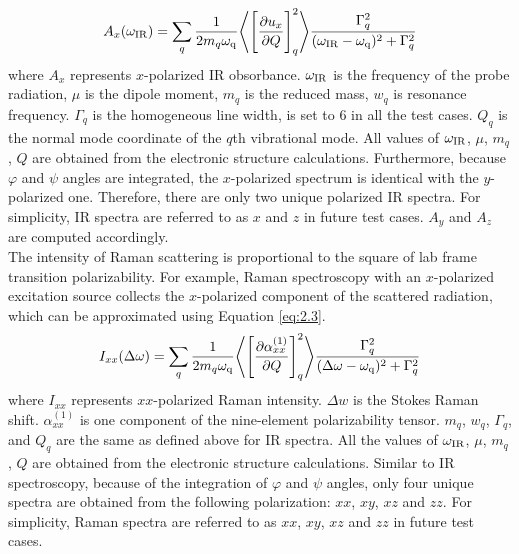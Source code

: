 \begin{equation} \label{eq:2.2}
A_x(\omega_{\rm IR}) = \sum_{q} \frac{1}{2 m_{q} \omega_{\rm q}} \Bigg \langle \Bigg\lbrack \frac{\partial u_x}{\partial Q} \Bigg\rbrack_{q} ^2 \Bigg\rangle \frac{\Gamma_q^2}{(\omega_{\rm IR}-\omega_{\rm q})^2 + \Gamma_q^2}
\end{equation} 
where $A_x$ represents $x$-polarized IR obsorbance. $\omega_{\rm IR}$ is the frequency of the probe radiation, $\mu$ is the dipole moment, $m_q$ is the reduced mass, $w_q$ is resonance frequency. $\Gamma_q$ is the homogeneous line width, is set to $6$ in all the test cases. $Q_q$ is the normal mode coordinate of the $q$th vibrational mode. All values of $\omega_{\rm IR}$, $\mu$, $m_q$, $Q$ are obtained from the electronic structure calculations. Furthermore, because $\varphi$ and $\psi$ angles are integrated, the $x$-polarized spectrum is identical with the $y$-polarized one. Therefore, there are only two unique polarized IR spectra. For simplicity, IR spectra are referred to as $x$ and $z$ in future test cases. $A_y$ and $A_z$ are computed accordingly.\\

The intensity of Raman scattering is proportional to the square of lab frame transition polarizability. For example, Raman spectroscopy with an $x$-polarized excitation source collects the $x$-polarized component of the scattered radiation, which can be approximated using Equation \ref{eq:2.3}. \\

\begin{equation} \label{eq:2.3}
I_{xx}(\Delta \omega) = \sum_{q} \frac{1}{2 m_{q} \omega_{\rm q}} \Bigg \langle \Bigg\lbrack \frac{\partial \alpha_{xx}^{(1)}}{\partial Q} \Bigg\rbrack_{q} ^2 \Bigg\rangle \frac{\Gamma_q^2}{(\Delta \omega-\omega_{\rm q})^2 + \Gamma_q^2}
\end{equation} 
where $I_{xx}$ represents $xx$-polarized Raman intensity. $\Delta w$ is the Stokes Raman shift. $\alpha_{xx}^{(1)}$ is one component of the nine-element polarizability tensor. $m_q$, $w_q$, $\Gamma_q$, and $Q_q$ are the same as defined above for IR spectra. All the values of $\omega_{\rm IR}$, $\mu$, $m_q$, $Q$ are obtained from the electronic structure calculations. Similar to IR spectroscopy, because of the integration of $\varphi$ and $\psi$ angles, only four unique spectra are obtained from the following polarization: $xx$, $xy$, $xz$ and $zz$. For simplicity, Raman spectra are referred to as $xx$, $xy$, $xz$ and $zz$ in future test cases. \\

